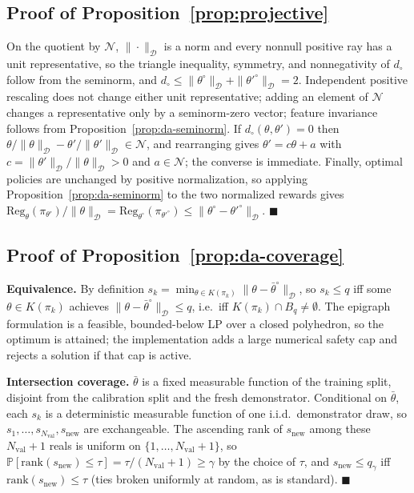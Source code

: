 \documentclass{article}
\newcommand{\Dnorm}[1]{\|#1\|_{\mathcal D}}
\begin{document}
\subsection{Proof of Proposition~\ref{prop:projective}}

On the quotient by $\mathcal N$, $\Dnorm{\cdot}$ is a norm and every nonnull
positive ray has a unit representative, so the triangle inequality, symmetry,
and nonnegativity of $d_\circ$ follow from the seminorm, and
$d_\circ\le\Dnorm{\theta^\circ}+\Dnorm{\theta'^\circ}=2$. Independent positive
rescaling does not change either unit representative; adding an element of
$\mathcal N$ changes a representative only by a seminorm-zero vector; feature
invariance follows from Proposition~\ref{prop:da-seminorm}. If
$d_\circ(\theta,\theta')=0$ then
$\theta/\Dnorm{\theta}-\theta'/\Dnorm{\theta'}\in\mathcal N$, and rearranging
gives $\theta'=c\theta+a$ with $c=\Dnorm{\theta'}/\Dnorm{\theta}>0$ and
$a\in\mathcal N$; the converse is immediate. Finally, optimal policies are
unchanged by positive normalization, so applying
Proposition~\ref{prop:da-seminorm} to the two normalized rewards gives
$\mathrm{Reg}_{\theta}(\pi_{\theta'})/\Dnorm{\theta}
=\mathrm{Reg}_{\theta^\circ}(\pi_{\theta'^\circ})
\le\Dnorm{\theta^\circ-\theta'^\circ}$. $\blacksquare$

\subsection{Proof of Proposition~\ref{prop:da-coverage}}
\label{app:proof-da-coverage}

\textbf{Equivalence.} By definition $s_k=\min_{\theta\in K(\pi_k)}
\Dnorm{\theta-\bar\theta^\circ}$, so $s_k\le q$ iff some $\theta\in K(\pi_k)$
achieves $\Dnorm{\theta-\bar\theta^\circ}\le q$, i.e.\ iff $K(\pi_k)\cap
B_q\ne\emptyset$. The epigraph formulation is a feasible, bounded-below LP over
a closed polyhedron, so the optimum is attained; the implementation adds a
large numerical safety cap and rejects a solution if that cap is active.

\textbf{Intersection coverage.} $\bar\theta$ is a fixed measurable function of the training
split, disjoint from the calibration split and the fresh demonstrator.
Conditional on $\bar\theta$, each $s_k$ is a deterministic measurable function
of one i.i.d.\ demonstrator draw, so
$s_1,\dots,s_{N_{\mathrm{val}}},s_{\mathrm{new}}$ are exchangeable. The
ascending rank of $s_{\mathrm{new}}$ among these $N_{\mathrm{val}}+1$ reals is
uniform on $\{1,\dots,N_{\mathrm{val}}+1\}$, so
$\mathbb P[\mathrm{rank}(s_{\mathrm{new}})\le\tau]=\tau/(N_{\mathrm{val}}+1)\ge
\gamma$ by the choice of $\tau$, and $s_{\mathrm{new}}\le q_\gamma$ iff
$\mathrm{rank}(s_{\mathrm{new}})\le\tau$ (ties broken uniformly at random, as
is standard). $\blacksquare$
\end{document}
